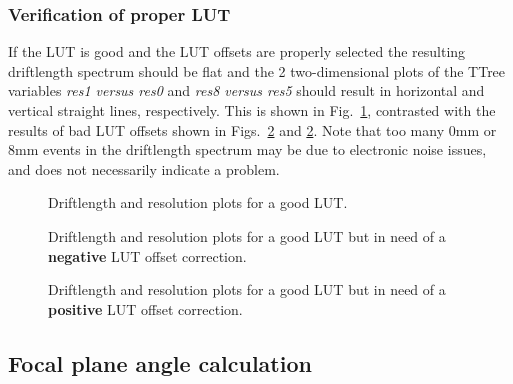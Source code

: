 \documentclass[11pt]{report}
\begin{document}
\newpage
\subsubsection{Verification of proper LUT}\label{sec:LUTverification}

If the LUT is good and the LUT offsets are properly selected
the resulting driftlength spectrum should be flat
and the 2 two-dimensional plots of the TTree variables {\it res1 versus res0}
and {\it res8 versus res5}
should result in horizontal and vertical straight lines, respectively.
This is shown in Fig.~\ref{fig:resplots-good}, contrasted with the results of 
bad LUT offsets shown in Figs.~\ref{fig:resplots-bad} and \ref{fig:resplots-bad}.
%
Note that too many 0mm or 8mm  events in the driftlength spectrum
may be due to electronic noise issues, and does not necessarily
indicate a problem.

\begin{figure}
\centerline{\vspace{0cm}\hspace{0cm}
}
\centering
\caption{Driftlength and resolution plots for a good LUT.}
\label{fig:resplots-good}
\end{figure} 

\begin{figure}
\centerline{\vspace{0cm}\hspace{0cm}
}
\centering
\caption{Driftlength and resolution plots for a good LUT but in need of a 
{\bf negative} LUT offset correction.}
\label{fig:resplots-bad}
\end{figure} 

\begin{figure}
\centerline{\vspace{0cm}\hspace{0cm}
}
\centering
\caption{Driftlength and resolution plots for a good LUT but in need of a 
{\bf positive} LUT offset correction.}
\label{fig:resplots-bad2}
\end{figure} 

\newpage
\subsection{Focal plane angle calculation}
\end{document}
